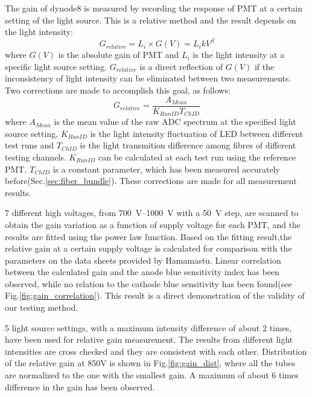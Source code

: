 \documentclass[review, times]{elsarticle}
\begin{document}
The gain of dynode8 is measured by recording the response of PMT at a certain setting of the light source. 
This is a relative method and the result depends on the light intensity:
\begin{equation}
 G_{relative} = L_i \times G(V) = L_i k V^\beta
 \label{equ:gain}
\end{equation}
where $G(V)$ is the absolute gain of PMT and $L_i$ is the light intensity at a specific light source setting.
$G_{relative}$ is a direct reflection of $G(V)$ if the inconsistency of light intensity can be eliminated between two measurements.
Two corrections are made to accomplish this goal, as follows: 
\begin{equation}
 G_{relative} = \frac{A_{Mean}}{K_{RunID} T_{ChID}}
 \label{equ:correction}
\end{equation} 
where $A_{Mean}$ is the mean value of the raw ADC spectrum at the specified light source setting,
$K_{RunID}$ is the light intensity fluctuation of LED between different test runs and $T_{ChID}$ is the light transmition difference among fibres of different testing channels.
$K_{RunID}$ can be calculated at each test run using the reference PMT.
$T_{ChID}$ is a constant parameter, which has been measured accurately before(Sec.\ref{sec:fiber_bundle}).
These corrections are made for all measurement results.

7 different high voltages, from \SIrange{700}{1000}{\volt} with a \SI{50}{\volt} step, are scanned to obtain the gain variation as a function of supply voltage for each PMT, and the results are fitted using the power law function.
Based on the fitting result,the relative gain at a certain supply voltage is calculated for comparison with the parameters on the data sheets provided by Hamamastu.
Linear correlation between the calculated gain and the anode blue sensitivity index has been observed, while no relation to the cathode blue sensitivity has been found(see Fig.\ref{fig:gain_correlation}).
This result is a direct demonstration of the validity of our testing method.

5 light source settings, with a maximum intensity difference of about 2 times, have been used for relative gain measurement.
The results from different light intensities are cross checked and they are consistent with each other.
Distribution of the relative gain at 850V is shown in Fig.\ref{fig:gain_dist}, where all the tubes are normalized to the one with the smallest gain. 
A maximum of about 6 times difference in the gain has been observed.
\end{document}
